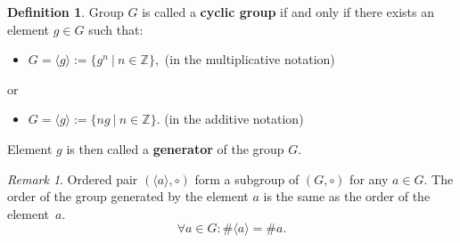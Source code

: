 \documentclass[thesis=M,english]{FITthesis}[2012/10/20]
\theoremstyle{remark}
\newtheorem*{RM}{Remark}
\theoremstyle{definition}
\newtheorem{DF}{Definition}[section]
\begin{document}
\begin{DF}
Group $G$ is called a \textbf{cyclic group} if and only if there exists an element $g \in G$ such that:
\begin{itemize}
\item $G = \langle g \rangle := \{ g^n\ |\ n \in \mathbb{Z} \},$ \hfill (in the multiplicative notation) 
\end{itemize}
or
\begin{itemize}
\item $G = \langle g \rangle := \{ ng\ |\ n \in \mathbb{Z} \}.$ \hfill (in the additive notation)
\end{itemize}
\end{DF}
\noindent Element $g$ is then called a \textbf{generator} of the group $G$.
\begin{RM}
Ordered pair $(\langle a \rangle, \circ)$ form a subgroup of $(G, \circ)$ for any $a \in G$. The order of the group generated by the element $a$ is the same as the order of the element~$a$. 
$$
\forall a \in G: \#\langle a \rangle = \#a.
$$
\end{RM}
\end{document}
